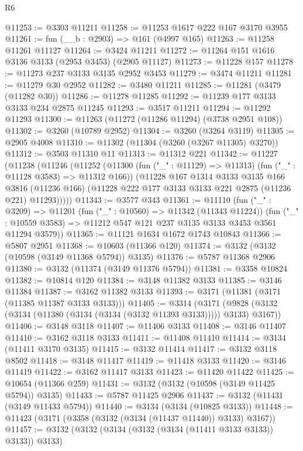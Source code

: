 \begin{lexlean}{R6}
\begin{coremodule}
@11253 := @3303 @11211
@11258 := @11253 @1617 @222 @167 @3170 @3955
@11261 := fun (__b : @2903) => @161 (@4997 @165)
@11263 := @11258 @11261 @11127
@11264 := @3424 @11211
@11272 := @11264 @151 @1616 @3136 @3133 (@2953 @3453) (@2905 @11127)
@11273 := @11228 @157
@11278 := @11273 @237 @3133 @3135 @2952 @3453
@11279 := @3474 @11211
@11281 := @11279 @30 @2952
@11282 := @3480 @11211
@11285 := @11281 (@3479 (@11282 @30))
@11286 := @11278 @11285
@11292 := @11239 @177 @3133 @3133 @234 @2875 @11245
@11293 := @3517 @11211
@11294 := @11292 @11293
@11300 := @11263 (@11272 (@11286 @11294) (@3738 @2951 @108))
@11302 := @3260 (@10789 @2952)
@11304 := @3260 (@3264 @3119)
@11305 := @2905 @4008
@11310 := @11302 (@11304 (@3260 (@3267 @11305) @3270))
@11312 := @3503 @11310 @11
@11313 := @11312 @221
@11342 := @11227
    (@11238
      (@11246
        (@11252
          (@11300 (fun ("_" : @11129) => @11313) (fun ("_" : @11128 @3583) => @11312 @166))
          (@11228
            @167
            @1314
            @3133
            @3135
            @166
            @3816
            (@11236 @166)
            (@11228 @222 @177 @3133 @3133 @221 @2875 (@11236 @221) @11293)))))
@11343 := @3577 @343
@11361 := @11110
    (fun ("_" : @3209) =>
    @11201
      (fun ("_" : @10560) => @11342 (@11343 @11224))
      (fun ("_" : @10559 @3583) => @11212 @547 @121 @237 @3135 @3133 @3453 @3561 @11294 @3579))
@11365 := @11121 @1634 @1672 @1743 @10843
@11366 := @5807 @2951
@11368 := @10603 (@11366 @120)
@11374 := @3132 (@3132 (@10598 (@3149 @11368 @5794)) @3135)
@11376 := @5787 @11368 @2906
@11380 := @3132 (@11374 (@3149 @11376 @5794))
@11381 := @3358 @10824
@11382 := @10814 @120
@11384 := @3148 @11382 @3133
@11385 := @3146 @11384
@11387 := @3162 @11382 @3133
@11393 := @3171 (@11381 (@3171 (@11385 @11387 @3133 @3133)))
@11405 := @3314
    (@3171 (@9828 (@3132 (@3134 (@11380 (@3134 (@3134 (@3132 @11393 @3133))))) @3133) @3167))
@11406 := @3148 @3118
@11407 := @11406 @3133
@11408 := @3146 @11407
@11410 := @3162 @3118 @3133
@11411 := @11408 @11410
@11414 := @3134 (@11411 @3170 @3135)
@11415 := @3132 @11414
@11417 := @3132 @3118 @8502
@11418 := @3148 @11417
@11419 := @11418 @3133
@11420 := @3146 @11419
@11422 := @3162 @11417 @3133
@11423 := @11420 @11422
@11425 := @10654 (@11366 @259)
@11431 := @3132 (@3132 (@10598 (@3149 @11425 @5794)) @3135)
@11433 := @5787 @11425 @2906
@11437 := @3132 (@11431 (@3149 @11433 @5794))
@11440 := @3134 (@3134 (@10825 @3133))
@11448 := @11423 (@3171 (@3358 (@3132 (@3134 (@11437 @11440)) @3133) @3167))
@11457 := @3132 (@3132 (@3134 (@3132 (@3134 (@11411 @3133 @3133)) @3133)) @3133)

\end{coremodule}
\end{lexlean}
